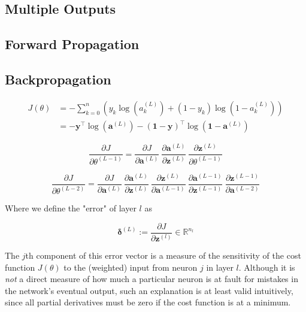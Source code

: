 \documentclass{article}[11pt]
\begin{document}
    \subsection{Multiple Outputs}
    
    \subsection{Forward Propagation}

    \subsection{Backpropagation}
        
        
        $$ \begin{aligned}
        J(\theta) &= - \sum_{k=0}^{n} \left( y_k \log(a^{(L)}_k) + (1 - y_k) \log(1 - a^{(L)}_k) \right) \\
            &= -\mathbf{y}^\top \log(\mathbf{a}^{(L)}) - (\mathbf{1}-\mathbf{y})^\top \log(\mathbf{1} - \mathbf{a}^{(L)})
        \end{aligned} $$
        
        
        
        $$
        \frac{\partial J}{\partial \theta^{(L-1)}} =
            \frac{\partial J}{\partial \mathbf{a}^{(L)}} \
            \frac{\partial \mathbf{a}^{(L)}}{\partial \mathbf{z}^{(L)}} \
            \frac{\partial \mathbf{z}^{(L)}}{\partial \theta^{(L-1)}}
        $$



        $$
        \frac{\partial J}{\partial \theta^{(L-2)}} =
            \frac{\partial J}{\partial \mathbf{a}^{(L)}} \
            \frac{\partial \mathbf{a}^{(L)}}{\partial \mathbf{z}^{(L)}} \
            \frac{\partial \mathbf{z}^{(L)}}{\partial \mathbf{a}^{(L-1)}} \
            \frac{\partial \mathbf{a}^{(L-1)}}{\partial \mathbf{z}^{(L-1)}} \
            \frac{\partial \mathbf{z}^{(L-1)}}{\partial \mathbf{a}^{(L-2)}}
        $$



        Where we define the "error" of layer $l$ as
    
        $$
        \mathbf{\delta}^{(L)} :=  \frac{\partial J}{\partial \mathbf{z}^{(l)}} \in \mathbb{R}^{n_l}
        $$
        
        The $j$th component of this error vector is a measure of the sensitivity of the cost function $J(\theta)$ to the (weighted) input from neuron $j$ in layer $l$. Although it is \textit{not} a direct measure of how much a particular neuron is at fault for mistakes in the network's eventual output, such an explanation is at least valid intuitively, since all partial derivatives must be zero if the cost function is at a minimum.
        
\end{document}
